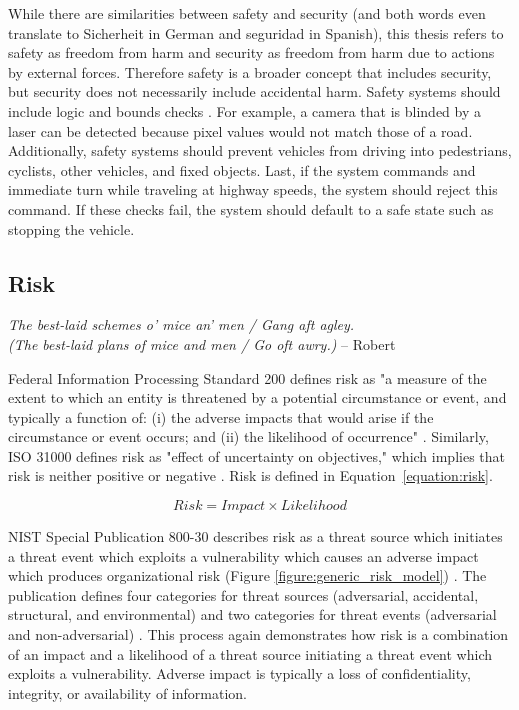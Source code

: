 \documentclass{article}
\begin{document}
While there are similarities between safety and security (and both words even translate to Sicherheit in German and seguridad in Spanish), this thesis refers to safety as freedom from harm and security as freedom from harm due to actions by external forces. Therefore safety is a broader concept that includes security, but security does not necessarily include accidental harm. Safety systems should include logic and bounds checks \citep{brooks_robust_1986}. For example, a camera that is blinded by a laser can be detected because pixel values would not match those of a road. Additionally, safety systems should prevent vehicles from driving into pedestrians, cyclists, other vehicles, and fixed objects. Last, if the system commands and immediate turn while traveling at highway speeds, the system should reject this command. If these checks fail, the system should default to a safe state such as stopping the vehicle.

\subsection{Risk} \label{subsection:risk}
\begin{mdframed}
    \emph{The best-laid schemes o' mice an' men / Gang aft agley. \\ (The best-laid plans of mice and men / Go oft awry.)} -- Robert \cite{burns_mouse_1785}
\end{mdframed}

\noindent Federal Information Processing Standard 200 defines risk as "a measure of the extent to which an entity is threatened by a potential circumstance or event, and typically a function of: (i) the adverse impacts that would arise if the circumstance or event occurs; and (ii) the likelihood of occurrence" \citep{national_institute_of_standards_and_technology_federal_2006}. Similarly, ISO 31000 defines risk as "effect of uncertainty on objectives," which implies that risk is neither positive or negative \citep{international_organization_for_standardization_iso_2018}. Risk is defined in Equation~\ref{equation:risk}.

\begin{equation}
    Risk = Impact \times Likelihood
    \label{equation:risk}
\end{equation}

NIST Special Publication 800-30 describes risk as a \gls{threat source} which initiates a \gls{threat event} which exploits a \gls{vulnerability} which causes an \gls{adverse impact} which produces \gls{organizational risk} (Figure \ref{figure:generic_risk_model}) \citep{national_institute_of_standards_and_technology_nist_2012}. The publication defines four categories for threat sources (adversarial, accidental, structural, and environmental) \citep[Appendix D]{national_institute_of_standards_and_technology_nist_2012} and two categories for threat events (adversarial and non-adversarial) \citep[Appendix E]{national_institute_of_standards_and_technology_nist_2012}.  This process again demonstrates how risk is a combination of an impact and a likelihood of a threat source initiating a threat event which exploits a vulnerability. Adverse impact is typically a loss of confidentiality, integrity, or availability of information.
\end{document}
